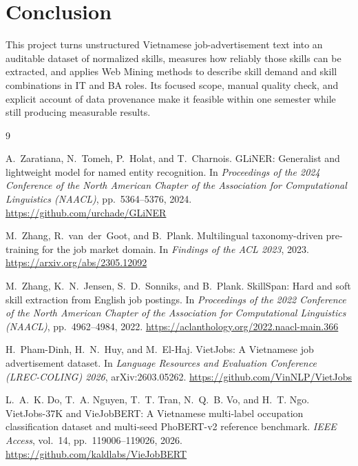 \documentclass[12pt,a4paper]{article}
\begin{document}
\section{Conclusion}
This project turns unstructured Vietnamese job-advertisement text into an
auditable dataset of normalized skills, measures how reliably those skills
can be extracted, and applies Web Mining methods to describe skill demand and
skill combinations in IT and BA roles. Its focused scope, manual quality
check, and explicit account of data provenance make it feasible within one
semester while still producing measurable results.

\begin{thebibliography}{9}

A.~Zaratiana, N.~Tomeh, P.~Holat, and T.~Charnois.
GLiNER: Generalist and lightweight model for named entity recognition.
In \emph{Proceedings of the 2024 Conference of the North American Chapter
of the Association for Computational Linguistics (NAACL)},
pp.~5364--5376, 2024.
\url{https://github.com/urchade/GLiNER}

M.~Zhang, R.~van~der~Goot, and B.~Plank.
Multilingual taxonomy-driven pre-training for the job market domain.
In \emph{Findings of the ACL 2023}, 2023.
\url{https://arxiv.org/abs/2305.12092}

M.~Zhang, K.~N.~Jensen, S.~D.~Sonniks, and B.~Plank.
SkillSpan: Hard and soft skill extraction from English job postings.
In \emph{Proceedings of the 2022 Conference of the North American Chapter
of the Association for Computational Linguistics (NAACL)},
pp.~4962--4984, 2022.
\url{https://aclanthology.org/2022.naacl-main.366}

H.~Pham-Dinh, H.~N.~Huy, and M.~El-Haj.
VietJobs: A Vietnamese job advertisement dataset.
In \emph{Language Resources and Evaluation Conference (LREC-COLING) 2026},
arXiv:2603.05262.
\url{https://github.com/VinNLP/VietJobs}

L.~A.~K. Do, T.~A. Nguyen, T.~T. Tran, N.~Q.~B. Vo, and H.~T. Ngo.
VietJobs-37K and VieJobBERT: A Vietnamese multi-label occupation
classification dataset and multi-seed PhoBERT-v2 reference benchmark.
\emph{IEEE Access}, vol.~14, pp.~119006--119026, 2026.
\url{https://github.com/kaldlabs/VieJobBERT}


\end{thebibliography}
\end{document}
